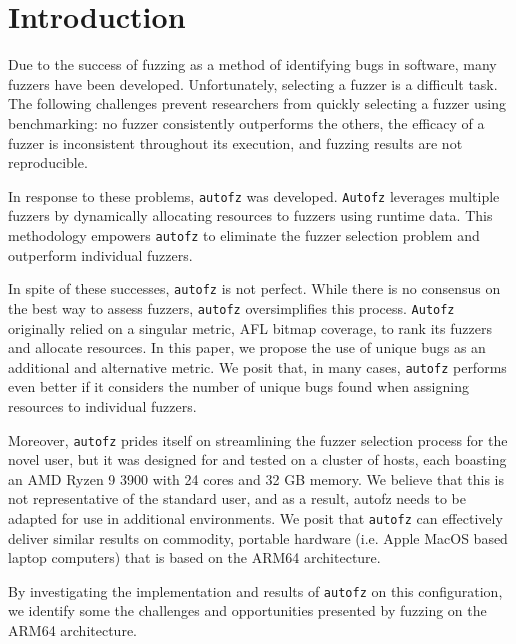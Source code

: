 \section{Introduction}

Due to the success of fuzzing as a method of identifying bugs in software, many fuzzers have been 
developed. Unfortunately, selecting a fuzzer is a difficult task. The following challenges prevent 
researchers from quickly selecting a fuzzer using benchmarking: no fuzzer consistently outperforms 
the others, the efficacy of a fuzzer is inconsistent throughout its execution, and fuzzing results 
are not reproducible.

In response to these problems, \texttt{autofz} was developed. \texttt{Autofz} leverages multiple fuzzers by dynamically 
allocating resources to fuzzers using runtime data. This methodology empowers \texttt{autofz} to eliminate the 
fuzzer selection problem and outperform individual fuzzers.

In spite of these successes, \texttt{autofz} is not perfect. While there is no consensus on the best way to 
assess fuzzers, \texttt{autofz} oversimplifies this process. \texttt{Autofz} originally relied on a 
singular metric, AFL bitmap coverage, to rank its fuzzers and allocate resources. In this paper, we
propose the use of unique bugs as an additional and alternative metric. We posit that, in 
many cases, \texttt{autofz} performs even better if it considers the number of unique bugs found when assigning 
resources to individual fuzzers.

Moreover, \texttt{autofz} prides itself on streamlining the fuzzer selection process for the novel user, but 
it was designed for and tested on a cluster of hosts, each boasting an AMD Ryzen 9 3900 with 24 cores 
and 32 GB memory. We believe that this is not representative of the standard user, and as a result, 
autofz needs to be adapted for use in additional environments. \cite{fu_autofz_2023} We posit that \texttt{autofz} can 
effectively deliver similar results on commodity, portable hardware (i.e. Apple MacOS based laptop 
computers) that is based on the ARM64 architecture. 

By investigating the implementation and results of \texttt{autofz} on this configuration, we identify some the 
challenges and opportunities presented by fuzzing on the ARM64 architecture.

